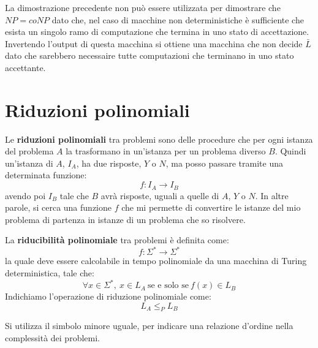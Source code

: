La dimostrazione precedente non può essere utilizzata per dimostrare che $NP = coNP$ 
dato che, nel caso di macchine non deterministiche è sufficiente che esista un singolo 
ramo di computazione che termina in uno stato di accettazione. Invertendo l'output di questa 
macchina si ottiene una macchina che non decide $\bar{L}$ dato che sarebbero necessaire 
tutte computazioni che terminano in uno stato accettante.
\section{Riduzioni polinomiali}
Le \textbf{riduzioni polinomiali} tra problemi sono delle procedure che per ogni 
istanza del problema $A$ la trasformano in un'istanza per un problema diverso $B$. 
Quindi un'istanza di $A$, $I_A$, ha due risposte, $Y$ o $N$, ma posso passare tramite 
una determinata funzione:
\begin{equation}
    f: I_A \to I_B
\end{equation}
avendo poi $I_B$ tale che $B$ avrà risposte, uguali a quelle di $A$, $Y$ o $N$. 
In altre parole, si cerca una funzione $f$ che mi permette di convertire le 
istanze del mio problema di partenza in istanze di un problema che so risolvere.

\begin{definizione}
    La \textbf{riducibilità polinomiale} tra problemi è definita come: 
    \begin{equation}
        f: \Sigma^{\ast} \to \Sigma^{\ast}
    \end{equation}
    la quale deve essere calcolabile in tempo polinomiale da una macchina di Turing 
    deterministica, tale che: 
    \begin{equation}
        \forall x \in \Sigma^{\ast}, \ x \in L_A \ \text{se e solo se} \ f(x) \in L_B
    \end{equation}
    Indichiamo l'operazione di riduzione polinomiale come: 
    \begin{equation}
        L_A \leq_P L_B
    \end{equation}
\end{definizione}
\begin{osservazione}
    Si utilizza il simbolo minore uguale, per indicare una relazione d'ordine 
    nella complessità dei problemi.
\end{osservazione}

